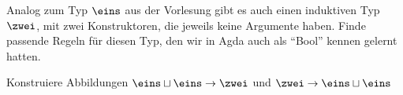 \documentclass{hott-übung}
\begin{document}
\setcounter{blattnummer}{1}
\setcounter{aufgabennummer}{0}

\blatt

\aufgabe{}
Analog zum Typ $\eins$ aus der Vorlesung gibt es auch einen induktiven Typ $\zwei$,
mit zwei Konstruktoren, die jeweils keine Argumente haben.
Finde passende Regeln für diesen Typ, den wir in Agda auch als ``Bool'' kennen gelernt hatten. 

Konstruiere Abbildungen $\eins\sqcup \eins\to \zwei$ und $\zwei\to \eins\sqcup \eins$
\end{document}
